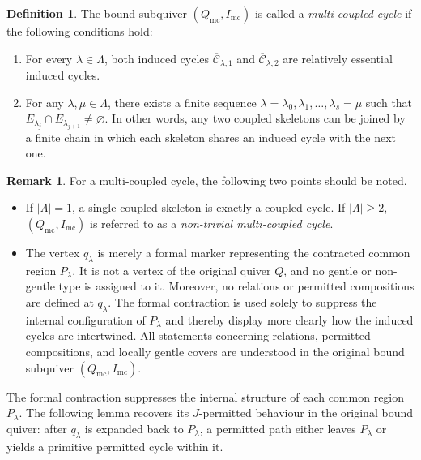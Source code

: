 \documentclass[11pt]{amsart}
\numberwithin{equation}{section}
\theoremstyle{definition}
\newtheorem{remark}[theorem]{Remark}
\newtheorem{definition}[theorem]{Definition}
\begin{document}
\begin{definition}\label{def:multi-coupled-cycle}
 The bound subquiver $(Q_{\mathrm{mc}},I_{\mathrm{mc}})$ is
called a \emph{multi-coupled cycle} if the following conditions hold:

\begin{enumerate}[label=(\text{MC}\arabic*), ref=(\text{MC}\arabic*)]
    \item \label{MC1} For every $\lambda\in\Lambda$, both induced
    cycles $\overline{\mathcal C}_{\lambda,1}$ and
    $\overline{\mathcal C}_{\lambda,2}$ are relatively essential
    induced cycles.

    \item \label{MC2} For any $\lambda,\mu\in\Lambda$, there exists
    a finite sequence $\lambda=\lambda_0,\lambda_1,\ldots,
      \lambda_s=\mu$ such that $E_{\lambda_j}\cap E_{\lambda_{j+1}}\neq\varnothing$.
    In other words, any two coupled skeletons can be joined by a finite chain in which each skeleton shares an induced cycle with the next
    one.
\end{enumerate}

\end{definition}

\begin{remark}\label{rem:multi_coupled}
For a multi-coupled cycle, the following two points should be noted.
\begin{itemize}
    \item If \(|\Lambda|=1\), a single coupled skeleton is exactly a coupled cycle. If \(|\Lambda|\geq2\), \((Q_{\mathrm{mc}},I_{\mathrm{mc}})\) is referred to as a \emph {non-trivial multi-coupled cycle}.
    \item  The vertex \(q_\lambda\) is merely a formal marker representing the contracted common region \(P_\lambda\). It is not a vertex of the original quiver \(Q\), and no gentle or non-gentle type is assigned to it. Moreover, no relations or permitted compositions are defined at \(q_\lambda\). The formal contraction is used solely to suppress the internal configuration of \(P_\lambda\) and thereby display more clearly how the induced cycles are intertwined. All statements concerning relations, permitted compositions, and locally gentle covers are understood in the original bound subquiver \((Q_{\mathrm{mc}},I_{\mathrm{mc}})\).
\end{itemize}

\end{remark}

The formal contraction suppresses the internal structure of each common
region \(P_\lambda\). The following lemma recovers its \(J\)-permitted
behaviour in the original bound quiver: after \(q_\lambda\) is expanded
back to \(P_\lambda\), a permitted path either leaves
\(P_\lambda\) or yields a primitive permitted cycle within it.
\end{document}

